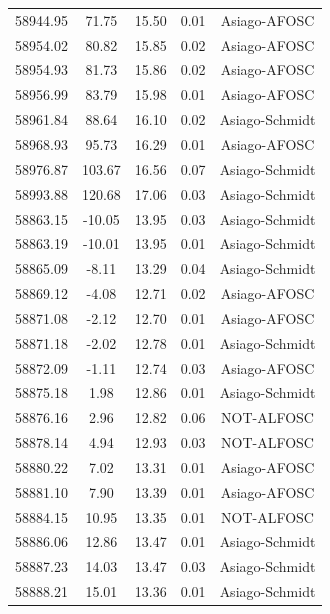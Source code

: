 \begin{longtable}{|c|c|c|c|c|}
 58944.95 &   71.75 &       15.50 &          0.01 & Asiago-AFOSC  \\
 58954.02 &   80.82 &       15.85 &          0.02 & Asiago-AFOSC  \\
 58954.93 &   81.73 &       15.86 &          0.02 & Asiago-AFOSC  \\
 58956.99 &   83.79 &       15.98 &          0.01 & Asiago-AFOSC  \\
 58961.84 &   88.64 &       16.10 &          0.02 & Asiago-Schmidt \\
 58968.93 &   95.73 &       16.29 &          0.01 & Asiago-AFOSC  \\
 58976.87 &  103.67 &       16.56 &          0.07 & Asiago-Schmidt \\
 58993.88 &  120.68 &       17.06 &          0.03 & Asiago-Schmidt \\
 58863.15 &  -10.05 &       13.95 &          0.03 & Asiago-Schmidt   \\
 58863.19 &  -10.01 &       13.95 &          0.01 & Asiago-Schmidt \\
 58865.09 &   -8.11 &       13.29 &          0.04 & Asiago-Schmidt \\
 58869.12 &   -4.08 &       12.71 &          0.02 & Asiago-AFOSC  \\
 58871.08 &   -2.12 &       12.70 &          0.01 & Asiago-AFOSC  \\
 58871.18 &   -2.02 &       12.78 &          0.01 & Asiago-Schmidt \\
 58872.09 &   -1.11 &       12.74 &          0.03 & Asiago-AFOSC    \\
 58875.18 &    1.98 &       12.86 &          0.01 & Asiago-Schmidt \\
 58876.16 &    2.96 &       12.82 &          0.06 & NOT-ALFOSC   \\
 58878.14 &    4.94 &       12.93 &          0.03 & NOT-ALFOSC   \\
 58880.22 &    7.02 &       13.31 &          0.01 & Asiago-AFOSC  \\
 58881.10 &    7.90 &       13.39 &          0.01 & Asiago-AFOSC  \\
 58884.15 &   10.95 &       13.35 &          0.01 & NOT-ALFOSC   \\
 58886.06 &   12.86 &       13.47 &          0.01 & Asiago-Schmidt \\
 58887.23 &   14.03 &       13.47 &          0.03 & Asiago-Schmidt \\
 58888.21 &   15.01 &       13.36 &          0.01 & Asiago-Schmidt \\

\end{longtable}

